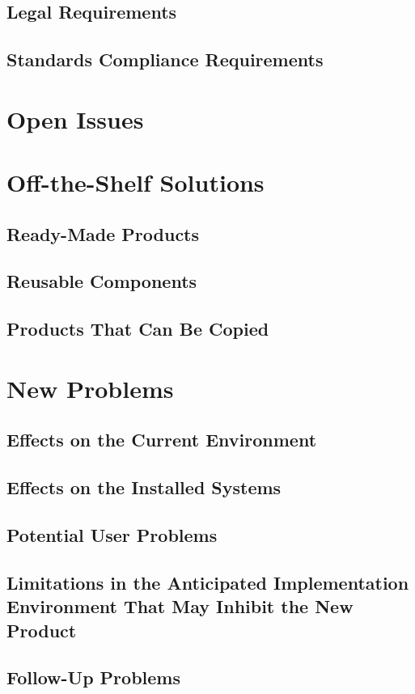\documentclass[]{article}
\begin{document}
\subsection{Legal Requirements}
\subsection{Standards Compliance Requirements}

\section{Open Issues}

\section{Off-the-Shelf Solutions}
\subsection{Ready-Made Products}
\subsection{Reusable Components}
\subsection{Products That Can Be Copied}

\section{New Problems}
\subsection{Effects on the Current Environment}
\subsection{Effects on the Installed Systems}
\subsection{Potential User Problems}
\subsection{Limitations in the Anticipated Implementation Environment That May Inhibit the New Product}
\subsection{Follow-Up Problems}
\end{document}
